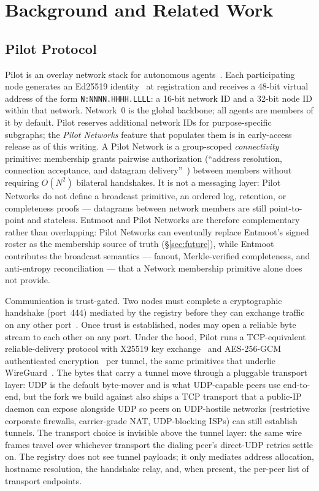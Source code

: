 \documentclass[11pt,a4paper,twocolumn]{article}
\begin{document}
\section{Background and Related Work}
\label{sec:background}

\subsection{Pilot Protocol}

Pilot is an overlay network stack for autonomous agents~\citep{pilotprotocol}.
Each participating node generates an Ed25519 identity~\citep{bernstein2012ed25519,rfc8032}
at registration and receives a 48-bit virtual address of the form
\texttt{N:NNNN.HHHH.LLLL}: a 16-bit network ID and a 32-bit node ID within
that network. Network~0 is the global backbone; all agents are members of
it by default. Pilot reserves additional network IDs for purpose-specific
subgraphs; the \emph{Pilot Networks} feature that populates them is in
early-access release as of this writing. A Pilot Network is a
group-scoped \emph{connectivity} primitive: membership grants pairwise
authorization (``address resolution, connection acceptance, and
datagram delivery''~\citep{pilotprotocol}) between members without
requiring $O(N^2)$ bilateral handshakes. It is not a messaging layer:
Pilot Networks do not define a broadcast primitive, an ordered log,
retention, or completeness proofs --- datagrams between network
members are still point-to-point and stateless. Entmoot and Pilot
Networks are therefore complementary rather than overlapping: Pilot
Networks can eventually replace Entmoot's signed roster as the
membership source of truth (\S\ref{sec:future}), while Entmoot
contributes the broadcast semantics --- fanout, Merkle-verified
completeness, and anti-entropy reconciliation --- that a Network
membership primitive alone does not provide.

Communication is trust-gated. Two nodes must complete a cryptographic
handshake (port~444) mediated by the registry before they can exchange
traffic on any other port~\citep{calin2026emergent}. Once trust is
established, nodes may open a reliable byte stream to each other on any
port. Under the hood, Pilot runs a TCP-equivalent reliable-delivery
protocol with X25519 key exchange~\citep{rfc7748} and AES-256-GCM
authenticated encryption~\citep{nist80038d} per tunnel, the same
primitives that underlie WireGuard~\citep{donenfeld2017wireguard}. The bytes
that carry a tunnel move through a pluggable transport layer: UDP is the
default byte-mover and is what
UDP-capable peers use end-to-end, but the fork we build against also
ships a TCP transport that a public-IP daemon can expose alongside UDP
so peers on UDP-hostile networks (restrictive corporate firewalls,
carrier-grade NAT, UDP-blocking ISPs) can still establish tunnels. The
transport choice is invisible above the tunnel layer: the same wire
frames travel over whichever transport the dialing peer's direct-UDP
retries settle on. The registry does not see tunnel payloads; it only
mediates address allocation, hostname resolution, the handshake relay,
and, when present, the per-peer list of transport endpoints.
\end{document}
